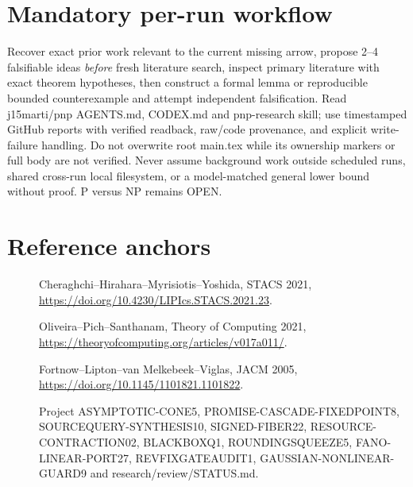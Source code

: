 \documentclass[11pt]{article}
\begin{document}
\section*{Mandatory per-run workflow}
Recover exact prior work relevant to the current missing arrow, propose 2--4 falsifiable ideas \emph{before} fresh literature search, inspect primary literature with exact theorem hypotheses, then construct a formal lemma or reproducible bounded counterexample and attempt independent falsification. Read j15marti/pnp AGENTS.md, CODEX.md and pnp-research skill; use timestamped GitHub reports with verified readback, raw/code provenance, and explicit write-failure handling. Do not overwrite root main.tex while its ownership markers or full body are not verified. Never assume background work outside scheduled runs, shared cross-run local filesystem, or a model-matched general lower bound without proof. P versus NP remains OPEN.

\section*{Reference anchors}
\begin{description}
\item[] Cheraghchi--Hirahara--Myrisiotis--Yoshida, STACS 2021, \url{https://doi.org/10.4230/LIPIcs.STACS.2021.23}.
\item[] Oliveira--Pich--Santhanam, Theory of Computing 2021, \url{https://theoryofcomputing.org/articles/v017a011/}.
\item[] Fortnow--Lipton--van Melkebeek--Viglas, JACM 2005, \url{https://doi.org/10.1145/1101821.1101822}.
\item[] Project ASYMPTOTIC-CONE5, PROMISE-CASCADE-FIXEDPOINT8, SOURCEQUERY-SYNTHESIS10, SIGNED-FIBER22, RESOURCE-CONTRACTION02, BLACKBOXQ1, ROUNDINGSQUEEZE5, FANO-LINEAR-PORT27, REVFIXGATEAUDIT1, GAUSSIAN-NONLINEAR-GUARD9 and research/review/STATUS.md.
\end{description}
\end{document}

